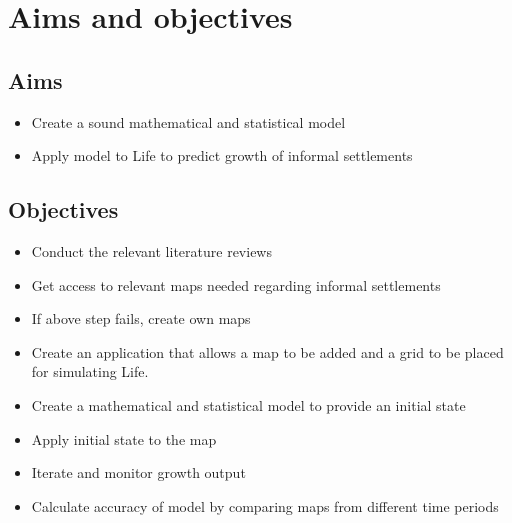 \section{Aims and objectives}
\subsection{Aims}
\begin{itemize}
\item Create a sound mathematical and statistical model
\item Apply model to Life to predict growth of informal settlements
\end{itemize}
\subsection{Objectives}
\begin{itemize}
\item Conduct the relevant literature reviews
\item Get access to relevant maps needed regarding informal settlements
\item If above step fails, create own maps
\item Create an application that allows a map to be added and a grid to be placed for simulating Life.
\item Create a mathematical and statistical model to provide an initial state
\item Apply initial state to the map
\item Iterate and monitor growth output
\item Calculate accuracy of model by comparing maps from different time periods
\end{itemize}